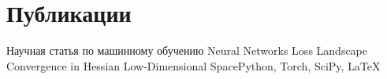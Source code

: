 \section{\textbf{Публикации}}
\resumeSubHeadingListStart

\resumeSubHeading
{Научная статья по машинному обучению}{\href{https://github.com/intsystems/2025-Project-183}{}}
{Neural Networks Loss Landscape Convergence in Hessian Low-Dimensional Space}{Python, Torch, SciPy, LaTeX}

\resumeSubHeadingListEnd
